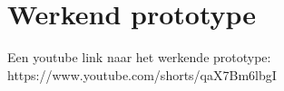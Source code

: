 \documentclass{article}
\begin{document}
\sffamily



\tableofcontents
\section{Werkend prototype}
Een youtube link naar het werkende prototype: https://www.youtube.com/shorts/qaX7Bm6lbgI
\newpage






% 
% 



\end{document}
